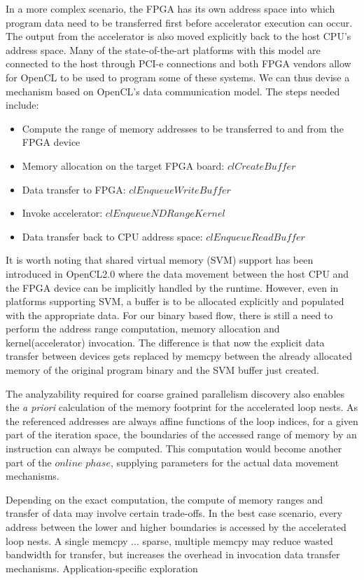 In a more complex scenario, the FPGA has its own address space into which program data need to be transferred first before accelerator execution can occur. The output from the accelerator
is also moved explicitly back to the host CPU's address space.
Many of the state-of-the-art platforms with this model
are connected to the host through PCI-e connections and both FPGA vendors allow for
OpenCL to be used to program some of these systems. We can thus devise
a mechanism based on OpenCL's data communication model. 
The steps needed include: 
\begin{itemize}
    \item Compute the range of memory addresses to be transferred to and from the FPGA device
    \item Memory allocation on the target FPGA board: $clCreateBuffer$ 
    \item Data transfer to FPGA: $clEnqueueWriteBuffer$
    \item Invoke accelerator: $clEnqueueNDRangeKernel$
    \item Data transfer back to CPU address space: $clEnqueueReadBuffer$
\end{itemize} 

It is worth noting that shared virtual memory (SVM) support has been introduced in OpenCL2.0 where the data movement between the host CPU and the FPGA device can be implicitly handled by the runtime. However, even
in platforms supporting SVM, a buffer is to be allocated explicitly and populated with the appropriate data. For our 
binary based flow, there is still a need to perform the address range computation, memory allocation and kernel(accelerator) invocation. The difference is that now the explicit data transfer between devices gets
replaced by memcpy between the already allocated memory of the original program binary and the SVM buffer just created. 

The analyzability required for coarse grained parallelism discovery 
also enables the \textit{a priori} calculation of the  memory footprint for the accelerated loop nests. As the referenced addresses are always affine functions of the loop indices, for a given part of the iteration space, the boundaries of the accessed range of memory by an instruction can always be
computed. This computation would become another part of the $online$ $phase$, supplying parameters for the actual data movement mechanisms. 


Depending on
the exact computation, the compute of memory ranges and transfer of data
may involve certain trade-offs.
In the best case scenario, every address between the lower and higher boundaries is accessed by the accelerated loop nests. A single memcpy ...
sparse, multiple memcpy may reduce wasted bandwidth for transfer, but increases the overhead in invocation data transfer mechanisms. Application-specific exploration



